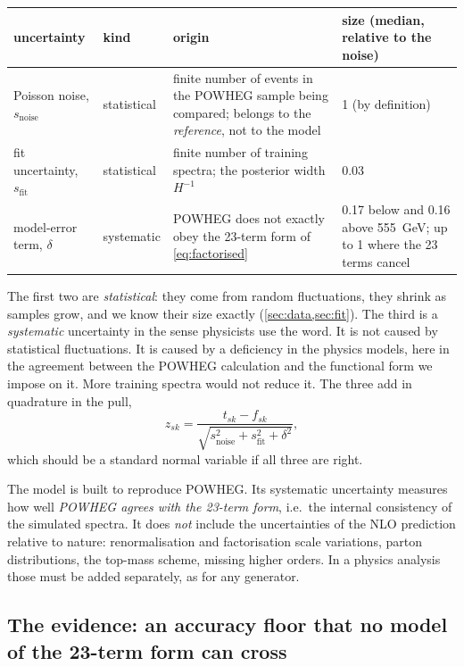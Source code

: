 \documentclass[11pt]{article}
\newcommand{\sfit}{s_{\text{fit}}}
\newcommand{\snoise}{s_{\text{noise}}}
\begin{document}
\begin{center}
\small
\renewcommand{\arraystretch}{1.25}
\begin{tabular}{p{3.2cm}p{2.0cm}p{5.3cm}p{3.6cm}}
\toprule
uncertainty & kind & origin & size (median, relative to the noise)\\
\midrule
Poisson noise, $\snoise$ & statistical & finite number of events in the POWHEG sample being compared;
  belongs to the \emph{reference}, not to the model & 1 (by definition)\\
fit uncertainty, $\sfit$ & statistical & finite number of training spectra; the posterior
  width $H^{-1}$ & 0.03\\
model-error term, $\delta$ & systematic & POWHEG does not exactly obey the 23-term form of
  \cref{eq:factorised} & 0.17 below and 0.16 above 555~GeV; up to 1 where the 23 terms
  cancel\\
\bottomrule
\end{tabular}
\end{center}

The first two are \emph{statistical}: they come from random fluctuations, they shrink as
samples grow, and we know their size exactly (\cref{sec:data,sec:fit}). The third is a
\emph{systematic} uncertainty in the sense physicists use the word. It is not caused by
statistical fluctuations. It is caused by a deficiency in the physics models, here in the
agreement between the POWHEG calculation and the functional form we impose on it. More
training spectra would not reduce it. The three add in quadrature in the pull,
\begin{equation}
  z_{sk} = \frac{t_{sk} - f_{sk}}{\sqrt{\snoise^2 + \sfit^2 + \delta^2}} ,
  \label{eq:pull}
\end{equation}
which should be a standard normal variable if all three are right.

\begin{watch}
The model is built to reproduce POWHEG. Its systematic uncertainty measures how well
\emph{POWHEG agrees with the 23-term form}, i.e.\ the internal consistency of the
simulated spectra. It does \emph{not} include the uncertainties of the NLO prediction
relative to nature: renormalisation and factorisation scale variations, parton distributions,
the top-mass scheme, missing higher orders. In a physics analysis those must be added
separately, as for any generator.
\end{watch}

\subsection{The evidence: an accuracy floor that no model of the 23-term form can cross}
\label{sec:evidence}
\end{document}

